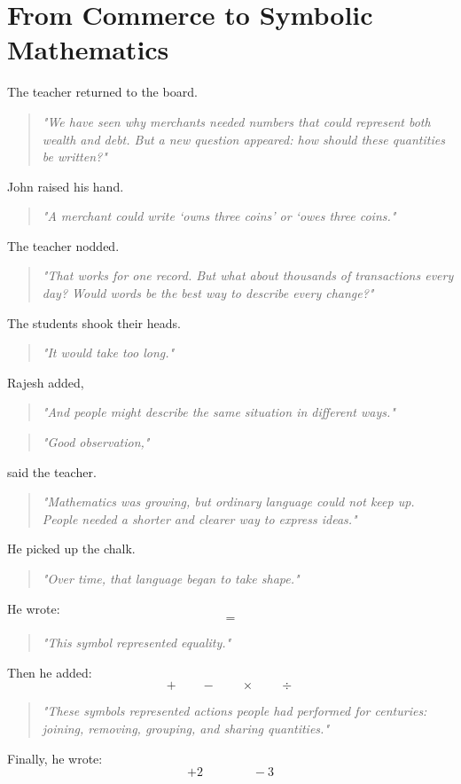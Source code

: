 \documentclass[11pt]{article}
\begin{document}
\section*{\textcolor{symbolicindigo}{From Commerce to Symbolic Mathematics}}

The teacher returned to the board.
\begin{quote}
\emph{"We have seen why merchants needed numbers that could represent both wealth and debt. But a new question appeared: how should these quantities be written?"}
\end{quote}
John raised his hand.
\begin{quote}
\emph{"A merchant could write `owns three coins' or `owes three coins."}
\end{quote}
The teacher nodded.
\begin{quote}
\emph{"That works for one record. But what about thousands of transactions every day? Would words be the best way to describe every change?"}
\end{quote}
The students shook their heads.
\begin{quote}
\emph{"It would take too long."}
\end{quote}
Rajesh added,
\begin{quote}
\emph{"And people might describe the same situation in different ways."}
\end{quote}
\begin{quote}
\emph{"Good observation,"}
\end{quote}
said the teacher.
\begin{quote}
\emph{"Mathematics was growing, but ordinary language could not keep up. People needed a shorter and clearer way to express ideas."}
\end{quote}
He picked up the chalk.
\begin{quote}
\emph{"Over time, that language began to take shape."}
\end{quote}
He wrote:
\[=\]
\begin{quote}
\emph{"This symbol represented equality."}
\end{quote}
Then he added:
\[
+\qquad -\qquad \times\qquad \div
\]
\begin{quote}
\emph{"These symbols represented actions people had performed for centuries: joining, removing, grouping, and sharing quantities."}
\end{quote}
Finally, he wrote:
\[+2\qquad\qquad-3\]
\end{document}
